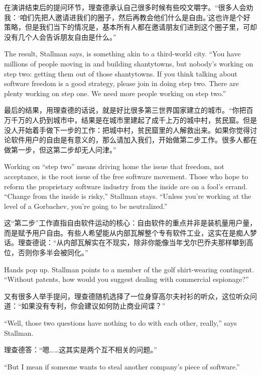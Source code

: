 \ifdefined\chs
在演讲结束后的提问环节，理查德承认自己很多时候有些咬文嚼字。“很多人会劝我：‘咱们先把人邀请进我们的圈子，然后再教会他们什么是自由。’这也许是个好策略，但是我们当下的情况是，基本所有人都在邀请朋友们进到这个圈子里，可却没有几个人会告诉朋友自由是什么。”
\fi

\ifdefined\eng
The result, Stallman says, is something akin to a third-world city. ``You have millions of people moving in and building shantytowns, but nobody's working on step two: getting them out of those shantytowns. If you think talking about software freedom is a good strategy, please join in doing step two. There are plenty working on step one. We need more people working on step two.''
\fi

\ifdefined\chs
最后的结果，用理查德的话说，就是好比很多第三世界国家建立的城市。“你把百万千万的人扔到城市中，结果是在城市里建起了成千上万的城中村，贫民窟。但是没人开始着手做下一步的工作：把城中村，贫民窟里的人解救出来。如果你觉得讨论软件用户的自由是有意义的，那么请加入我们，开始做第二步工作。很多人都在做第一步，但这第二步却无人问津。”
\fi

\ifdefined\eng
Working on ``step two'' means driving home the issue that freedom, not acceptance, is the root issue of the free software movement. Those who hope to reform the proprietary software industry from the inside are on a fool's errand. ``Change from the inside is risky,'' Stallman stays. ``Unless you're working at the level of a Gorbachev, you're going to be neutralized.''
\fi

\ifdefined\chs
这“第二步”工作直指自由软件运动的核心：自由软件的重点并非是装机量用户量，而是赋予用户自由。有些人希望能从内部瓦解整个专有软件工业，这实在是痴人梦话。理查德说：“从内部瓦解实在不现实，除非你能像当年戈尔巴乔夫那样攀到高位，否则你多半会被同化。”
\fi

\ifdefined\eng
Hands pop up. Stallman points to a member of the golf shirt-wearing contingent. ``Without patents, how would you suggest dealing with commercial espionage?''
\fi

\ifdefined\chs
又有很多人举手提问，理查德随机选择了一位身穿高尔夫衬衫的听众，这位听众问道：“如果没有专利，你会建议如何防止商业间谍？”
\fi

\ifdefined\eng
``Well, those two questions have nothing to do with each other, really,'' says Stallman.
\fi

\ifdefined\chs
理查德答：“嗯……这其实是两个互不相关的问题。”
\fi

\ifdefined\eng
``But I mean if someone wants to steal another company's piece of software.''
\fi

